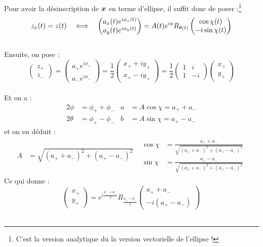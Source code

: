 Pour avoir la désinscription de $\bf{x}$ en terme d’ellipse, il suffit donc de poser :\footnote{C'est la version analytique du la version vectorielle de l'ellipse !}
\[z_x(t) = z(t)\quad \Llr\quad \begin{pmatrix}a_x(t) e^{i\phi_x(t)} \\ a_y(t) e^ {i\phi_y(t)}\end{pmatrix} = A(t)e^{i\phi} R_{\theta(t)} \begin{pmatrix} \cos\chi(t) \\ -i\sin\chi(t) \end{pmatrix}\]
\\
Ensuite, on pose :
\[\begin{pmatrix}z_+ \\ z_-\end{pmatrix} = \begin{pmatrix}a_+ e^{i\phi_+} \\ a_- e^{i\phi_-}\end{pmatrix} = \frac{1}{2}\begin{pmatrix}x_+ + iy_+ \\ x_+ - iy_+\end{pmatrix} = \frac{1}{2}\begin{pmatrix}1 & i \\ 1 & -i\end{pmatrix} \begin{pmatrix}x_+ \\ y_+\end{pmatrix}\]
\\
Et on a :
\begin{align*}
	2\phi &= \phi_+ + \phi_-  &  a &= A\cos\chi = a_+ + a_- \\
	2\theta &= \phi_+ - \phi_-  &  b &= A\sin\chi = a_+ - a_- 
\end{align*}
et on en déduit :
\begin{align*}
	A &= \sqrt{(a_+ + a_-)^2 + (a_+ - a_-)^2}  &  \begin{aligned} \cos\chi &= \frac{a_+ + a_- }{\sqrt{(a_+ + a_-)^2 + (a_+ - a_-)^2}}  \\  \sin\chi &= \frac{a_+ - a_- }{\sqrt{(a_+ + a_-)^2 + (a_+ - a_-)^2}}	\end{aligned}
\end{align*}
Ce qui donne \infine :
\[\begin{pmatrix}x_+ \\ y_+\end{pmatrix} = e^{i\frac{\phi_+ + \phi_-}{2}} R_{\frac{\phi_+ - \phi_-}{2}} \begin{pmatrix}a_+ + a_- \\ -i(a_+ - a_-)\end{pmatrix}\]
\\

